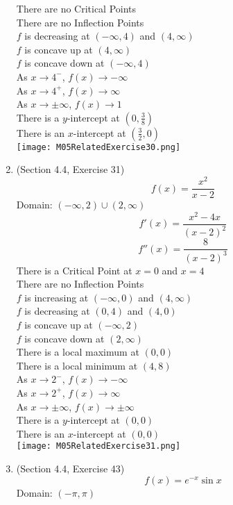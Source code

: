 \documentclass{article}
\begin{document}
\begin{enumerate}
        There are no Critical Points \\
        There are no Inflection Points \\
        $f$ is decreasing at $(-\infty, 4)$ and $(4, \infty)$ \\
        $f$ is concave up at $(4, \infty)$ \\
        $f$ is concave down at $(-\infty, 4)$ \\
        As $x \to 4^-$, $f(x) \to -\infty$ \\
        As $x \to 4^+$, $f(x) \to \infty$ \\
        As $x \to \pm \infty$, $f(x) \to 1$ \\
        There is a $y$-intercept at $\left(0, \frac{3}{8}\right)$ \\
        There is an $x$-intercept at $\left(\frac{3}{2}, 0\right)$ \\
        \texttt{[image: M05RelatedExercise30.png]}
    \item (Section 4.4, Exercise 31)
        $$f(x) = \frac{x^2}{x - 2}$$
        Domain: $(-\infty, 2)\cup(2, \infty)$
        $$f'(x) = \frac{x^2 - 4x}{\left(x - 2\right)^2}$$
        $$f''(x) = \frac{8}{\left(x-2\right)^{3}}$$
        There is a Critical Point at $x = 0$ and $x = 4$ \\
        There are no Inflection Points \\
        $f$ is increasing at $(-\infty, 0)$ and $(4, \infty)$ \\
        $f$ is decreasing at $(0, 4)$ and $(4, 0)$ \\
        $f$ is concave up at $(-\infty, 2)$ \\
        $f$ is concave down at $(2, \infty)$ \\
        There is a local maximum at $(0, 0)$ \\
        There is a local minimum at $(4, 8)$ \\
        As $x \to 2^-$, $f(x) \to -\infty$ \\
        As $x \to 2^+$, $f(x) \to \infty$ \\
        As $x \to \pm \infty$, $f(x) \to \pm \infty$ \\
        There is a $y$-intercept at $(0, 0)$ \\
        There is an $x$-intercept at $(0, 0)$ \\
        \texttt{[image: M05RelatedExercise31.png]}
    \item (Section 4.4, Exercise 43)
        $$f(x) = e^{-x}\sin{x}$$
        Domain: $(-\pi, \pi)$

\end{enumerate}
\end{document}
